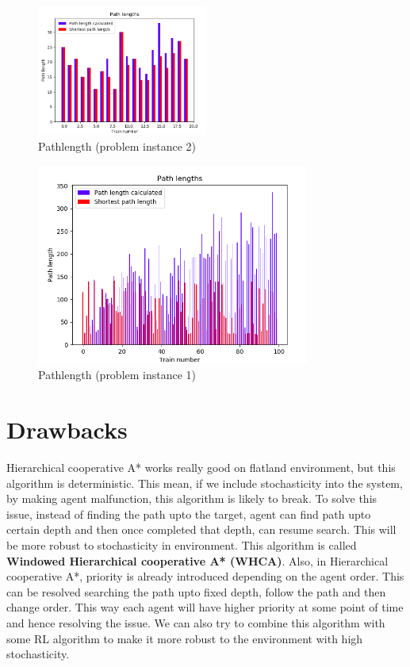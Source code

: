 \begin{figure}[h]
    \centering
    \includegraphics[width=0.5\textwidth]{cooperative4}
    \caption{Pathlength (problem instance 2)}
    \label{image-myimage2}
\end{figure}

\begin{figure}[H]
    \centering
    \includegraphics[width=0.8\textwidth]{cooperative5}
    \caption{Pathlength (problem instance 1)}
    \label{image-myimage2}
\end{figure}

\section{Drawbacks}
Hierarchical cooperative A* works really good on flatland environment, but this algorithm is deterministic.
This mean, if we include stochasticity into the system, by making agent malfunction, this algorithm is likely 
to break. To solve this issue, instead of finding the path upto the target, agent can find path upto certain 
depth and then once completed that depth, can resume search. This will be more robust to stochasticity in 
environment. This algorithm is called \textbf{Windowed Hierarchical cooperative A* (WHCA)}.
Also, in Hierarchical cooperative A*, priority is already introduced depending on the agent order. This can be resolved searching 
the path upto fixed depth, follow the path and then change order. This way each agent will have higher priority at some point 
of time and hence resolving the issue. We can also try to combine this algorithm with some RL algorithm to make it 
more robust to the environment with high stochasticity.